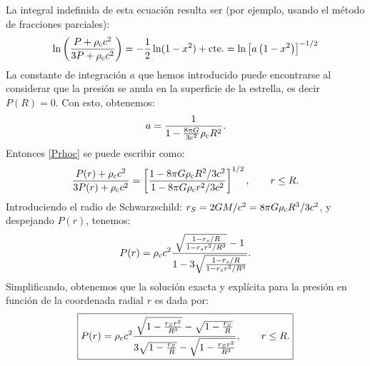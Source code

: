 La integral indefinida de esta ecuación resulta ser (por ejemplo, usando el método de fracciones parciales):
\begin{equation}\label{Prhoc}
\ln\left( \frac{P+\rho_{\rm c}c^2}{3P+\rho_{\rm c}c^2}\right)=-\frac{1}{2}\ln(1-x^2)+\text{cte.}=\ln\left[a\left(1-x^2\right)\right]^{-1/2}
\end{equation}
La constante de integración $a$ que hemos introducido puede encontrarse al considerar que la presión se anula en la superficie de la estrella, es decir $P(R)=0$. Con esto, obtenemos:
\begin{equation}
a=\frac{1}{1-\frac{8\pi G}{3 c^2}\rho_{\rm c} R^2}.
\end{equation}
Entonces \eqref{Prhoc} se puede escribir como:
\begin{equation}
\frac{P(r)+\rho_{\rm c}c^2}{3P(r)+\rho_{\rm c}c^2}=\left[\frac{1-8\pi G\rho_{\rm c}R^2/3c^2}{1-8\pi G\rho_{\rm c}r^2/3c^2} \right]^{1/2}, \qquad r\leq R.
\end{equation}
Introduciendo el radio de Schwarzschild: $r_S=2GM/c^2=8\pi G\rho_{\rm c}R^3/3c^2$, y despejando $P(r)$, tenemos:
\begin{gather}
P(r)=\rho_{\rm c} c^2\frac{\sqrt{\frac{1-r_s/R}{1-r_s r^2/R^3}}-1}{1-3\sqrt{\frac{1-r_s/R}{1-r_s r^2/R^3}}}.
\end{gather}
Simplificando, obtenemos que la solución exacta y explícita para la presión en función de la coordenada radial $r$ es dada por:
\begin{equation}\label{presioncondensidadcte}
\boxed{P(r)=\rho_{\rm c}c^2\frac{\sqrt{1-\frac{r_Sr^2}{R^3}}-\sqrt{1-\frac{r_S}{R}}}{ 3 \sqrt{1-\frac{r_S}{R}}-\sqrt{1-\frac{r_Sr^2}{R^3}}}, \qquad r\leq R.}
\end{equation}

